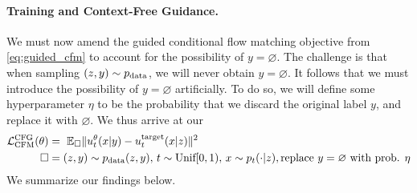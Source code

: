 \paragraph{Training and Context-Free Guidance.} We must now amend the guided conditional flow matching objective from \cref{eq:guided_cfm} to account for the possibility of $y = \varnothing$. The challenge is that when sampling $(z,y) \sim p_{\rm{data}}$, we will never obtain $y = \varnothing$. It follows that we must introduce the possibility of $y = \varnothing$ artificially. To do so, we will define some hyperparameter $\eta$ to be the probability that we discard the original label $y$, and replace it with $\varnothing$. We thus arrive at our 
\begin{align}
    \mathcal{L}_{\text{CFM}}^{\text{CFG}}(\theta) &= \,\,\mathbb{E}_{\square} \lVert u_t^{\theta}(x|y) - u^{\text{target}}_t(x|z)\rVert^2\\
    \square &= (z,y) \sim p_{\text{data}}(z,y),\, t \sim \text{Unif}[0,1),\, x \sim p_t(\cdot|z),\text{replace }y=\varnothing\text{ with prob. }\eta
\end{align}
We summarize our findings below.

